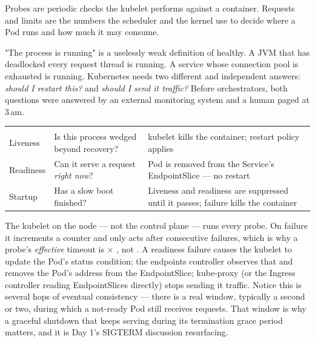 
 Probes are periodic checks the kubelet performs against a container. Requests and limits are the numbers the scheduler and the kernel use to decide where a Pod runs and how much it may consume.

 "The process is running" is a uselessly weak definition of healthy. A JVM that has deadlocked every request thread is running. A service whose connection pool is exhausted is running. Kubernetes needs two different and independent answers: \emph{should I restart this?} and \emph{should I send it traffic?} Before orchestrators, both questions were answered by an external monitoring system and a human paged at 3\,am.

\begin{center}\small
\wbrowcolors
\begin{tabularx}{\linewidth}{@{}L{20mm} X L{40mm}@{}}
 &  & \\
Liveness & Is this process wedged beyond recovery? & kubelet kills the container; restart policy applies\\
Readiness & Can it serve a request \emph{right now}? & Pod is removed from the Service's EndpointSlice --- no restart\\
Startup & Has a slow boot finished? & Liveness and readiness are suppressed until it passes; failure kills the container\\
\end{tabularx}
\end{center}

 The kubelet on the node --- not the control plane --- runs every probe. On failure it increments a counter and only acts after  consecutive failures, which is why a probe's \emph{effective} timeout is  $\times$ , not . A readiness failure causes the kubelet to update the Pod's status condition; the endpoints controller observes that and removes the Pod's address from the EndpointSlice; kube-proxy (or the Ingress controller reading EndpointSlices directly) stops sending it traffic. Notice this is several hops of eventual consistency --- there is a real window, typically a second or two, during which a not-ready Pod still receives requests. That window is why a graceful shutdown that keeps serving during its termination grace period matters, and it is Day 1's SIGTERM discussion resurfacing.

